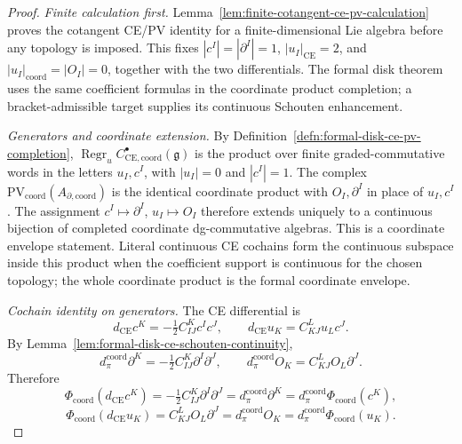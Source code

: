 \documentclass[11pt]{memoir}
\begin{document}
\begin{proof}
  \emph{Finite calculation first.}
  Lemma~\ref{lem:finite-cotangent-ce-pv-calculation} proves the
  cotangent CE/PV identity for a finite-dimensional Lie algebra before
  any topology is imposed.  This fixes
  \(|c^I|=|\partial^I|=1\),
  \(|u_I|_{\mathrm{CE}}=2\), and
  \(|u_I|_{\mathrm{coord}}=|O_I|=0\), together with the two
  differentials.  The formal disk theorem uses the same coefficient
  formulas in the coordinate product completion; a bracket-admissible
  target supplies its continuous Schouten enhancement.

  \emph{Generators and coordinate extension.}
  By Definition~\ref{defn:formal-disk-ce-pv-completion},
  \(\operatorname{Regr}_u C^\bullet_{\mathrm{CE},\mathrm{coord}}(\mathfrak g)\) is the product
  over finite graded-commutative words in the letters \(u_I,c^I\), with
  \(|u_I|=0\) and \(|c^I|=1\).  The complex
  \(\mathrm{PV}_{\mathrm{coord}}(A_{\partial,\mathrm{coord}})\) is the
  identical coordinate product with \(O_I,\partial^I\) in place of
  \(u_I,c^I\).  The assignment \(c^I\mapsto\partial^I\),
  \(u_I\mapsto O_I\) therefore extends uniquely to a continuous bijection
  of completed coordinate dg-commutative algebras.  This is a coordinate
  envelope statement.  Literal continuous CE cochains form the continuous
  subspace inside this product when the coefficient support is continuous
  for the chosen topology; the whole coordinate product is the formal
  coordinate envelope.

  \emph{Cochain identity on generators.} The CE differential is
  $$d_{\mathrm{CE}}c^K=-\tfrac12 C^K_{IJ}c^Ic^J,\qquad
    d_{\mathrm{CE}}u_K=C^L_{KJ}u_L c^J.$$
  By Lemma~\ref{lem:formal-disk-ce-schouten-continuity},
  $$d_\pi^{\mathrm{coord}}\partial^K=-\tfrac12 C^K_{IJ}\partial^I\partial^J,\qquad
    d_\pi^{\mathrm{coord}} O_K=C^L_{KJ}O_L\partial^J.$$
  Therefore
	  $$\Phi_{\mathrm{coord}}(d_{\mathrm{CE}}c^K)
	    =-\tfrac12 C^K_{IJ}\partial^I\partial^J
		    =d_\pi^{\mathrm{coord}}\partial^K=d_\pi^{\mathrm{coord}}\Phi_{\mathrm{coord}}(c^K),$$
		  $$\Phi_{\mathrm{coord}}(d_{\mathrm{CE}}u_K)
		    =C^L_{KJ}O_L\partial^J=d_\pi^{\mathrm{coord}} O_K
		    =d_\pi^{\mathrm{coord}}\Phi_{\mathrm{coord}}(u_K).$$


\end{proof}
\end{document}
